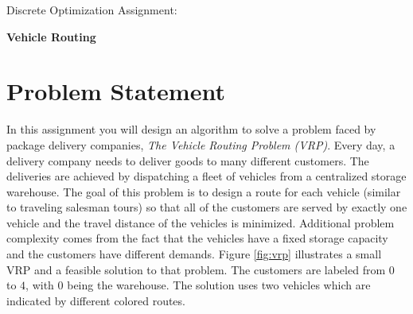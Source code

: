 \documentclass[11pt]{article}
\begin{document}
\huge
\noindent
{Discrete Optimization Assignment:}
\vspace{0.25cm}

\noindent
{\bf Vehicle Routing}
\normalsize


\section{Problem Statement}


In this assignment you will design an algorithm to solve a problem faced by package delivery companies, {\em The Vehicle Routing Problem (VRP)}.  Every day, a delivery company needs to deliver goods to many different customers.  The deliveries are achieved by dispatching a fleet of vehicles from a centralized storage warehouse.  The goal of this problem is to design a route for each vehicle (similar to traveling salesman tours) so that all of the customers are served by exactly one vehicle and the travel distance of the vehicles is minimized.  Additional problem complexity comes from the fact that the vehicles have a fixed storage capacity and the customers have different demands.  Figure \ref{fig:vrp} illustrates a small VRP and a feasible solution to that problem.  The customers are labeled from $0$ to $4$, with $0$ being the warehouse.  The solution uses two vehicles which are indicated by different colored routes.
\end{document}
